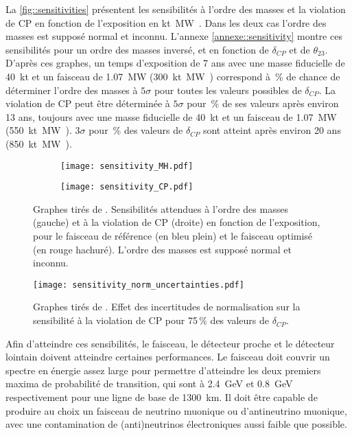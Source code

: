         La \autoref{fig::sensitivities} présentent les sensibilités à l'ordre des masses et la violation de CP en fonction de l'exposition en \si{\kilo\tonne\mega\watt\year}. Dans les deux cas l'ordre des masses est supposé normal et inconnu. L'annexe \ref{annexe::sensitivity} montre ces sensibilités pour un ordre des masses inversé, et en fonction de $\delta_{CP}$ et de $\theta_{23}$. D'après ces graphes, un temps d'exposition de 7 ans avec une masse fiducielle de \SI{40}{\kilo\tonne} et un faisceau de \SI{1.07}{\mega\watt} (\SI{300}{\kilo\tonne\mega\watt\year}) correspond à \,\% de chance de déterminer l'ordre des masses à $5\sigma$ pour toutes les valeurs possibles de $\delta_{CP}$. La violation de CP peut être déterminée à $5\sigma$ pour \,\% de ses valeurs après environ 13 ans, toujours avec une masse fiducielle de \SI{40}{\kilo\tonne} et un faisceau de \SI{1.07}{\mega\watt} (\SI{550}{\kilo\tonne\mega\watt\year}). $3\sigma$ pour \,\% des valeurs de $\delta_{CP}$ sont atteint après environ 20 ans (\SI{850}{\kilo\tonne\mega\watt\year}).

        
        \begin{figure}[htbp]
          \begin{subfigure}[t]{0.43\textwidth}
            \texttt{[image: sensitivity\_MH.pdf]}
          \end{subfigure}\hfill
          \begin{subfigure}[t]{0.43\textwidth}
            \texttt{[image: sensitivity\_CP.pdf]}
          \end{subfigure}
          \caption[Sensibilités attendues à l'ordre des masses et à la violation de CP]{\label{fig::sensitivities}Graphes tirés de \cite{Collaboration2015}. Sensibilités attendues à l'ordre des masses (gauche) et à la violation de CP (droite) en fonction de l'exposition, pour le faisceau de référence (en bleu plein) et le faisceau optimisé (en rouge hachuré). L'ordre des masses est supposé normal et inconnu.}
        \end{figure}

        \begin{wrapfigure}{R}{0.48\textwidth}
          \texttt{[image: sensitivity\_norm\_uncertainties.pdf]}
          \caption[Effet des incertitudes de normalisation sur la sensibilité de \gls{dune}]{\label{fig::normsigma_effect}Graphes tirés de \cite{Collaboration2015}. Effet des incertitudes de normalisation sur la sensibilité à la violation de CP pour 75\,\% des valeurs de $\delta_{CP}$.}
        \end{wrapfigure}
        Afin d'atteindre ces sensibilités, le faisceau, le détecteur proche et le détecteur lointain doivent atteindre certaines performances\cite{Collaboration2015}. Le faisceau doit couvrir un spectre en énergie assez large pour permettre d'atteindre les deux premiers maxima de probabilité de transition, qui sont à \SI{2.4}{\giga\electronvolt} et \SI{0.8}{\giga\electronvolt} respectivement pour une ligne de base de \SI{1300}{\kilo\meter}. Il doit être capable de produire au choix un faisceau de neutrino muonique ou d'antineutrino muonique, avec une contamination de (anti)neutrinos électroniques aussi faible que possible.

